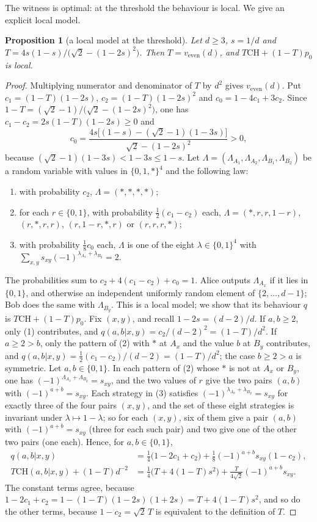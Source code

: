 \documentclass[11pt]{amsart}
\newtheorem{proposition}[theorem]{Proposition}
\theoremstyle{definition}
\theoremstyle{remark}
\numberwithin{equation}{section}
\newcommand{\veven}{v_{\mathrm{even}}}
\newcommand{\CH}{\mathrm{CH}}
\begin{document}
The witness is optimal: at the threshold the behaviour is local. We give an explicit local model.

\begin{proposition}[a local model at the threshold]\label{prop:flagmodel}
Let $d\ge3$, $s=1/d$ and $T=4s(1-s)/\bigl(\sqrt2-(1-2s)^2\bigr)$. Then $T=\veven(d)$, and $T\CH+(1-T)p_0$ is local.
\end{proposition}

\begin{proof}
Multiplying numerator and denominator of $T$ by $d^2$ gives $\veven(d)$. Put $c_1=(1-T)(1-2s)$, $c_2=(1-T)(1-2s)^2$ and
$c_0=1-4c_1+3c_2$. Since $1-T=(\sqrt2-1)/\bigl(\sqrt2-(1-2s)^2\bigr)$, one has $c_1-c_2=2s(1-T)(1-2s)\ge0$ and
\[
c_0=\frac{4s\bigl[(1-s)-(\sqrt2-1)(1-3s)\bigr]}{\sqrt2-(1-2s)^2}>0,
\]
because $(\sqrt2-1)(1-3s)<1-3s\le1-s$. Let $\Lambda=(\Lambda_{A_1},\Lambda_{A_2},\Lambda_{B_1},\Lambda_{B_2})$ be a random
variable with values in $\{0,1,\ast\}^4$ and the following law:
\begin{enumerate}
\item with probability $c_2$, $\Lambda=(\ast,\ast,\ast,\ast)$;
\item for each $r\in\{0,1\}$, with probability $\frac12(c_1-c_2)$ each, $\Lambda=(\ast,r,r,1-r)$, $(r,\ast,r,r)$,
$(r,1-r,\ast,r)$ or $(r,r,r,\ast)$;
\item with probability $\frac18c_0$ each, $\Lambda$ is one of the eight $\lambda\in\{0,1\}^4$ with
$\sum_{x,y}s_{xy}(-1)^{\lambda_{A_x}+\lambda_{B_y}}=2$.
\end{enumerate}
The probabilities sum to $c_2+4(c_1-c_2)+c_0=1$. Alice outputs $\Lambda_{A_x}$ if it lies in $\{0,1\}$, and otherwise an
independent uniformly random element of $\{2,\dots,d-1\}$; Bob does the same with $\Lambda_{B_y}$. This is a local
model; we show that its behaviour $q$ is $T\CH+(1-T)p_0$. Fix $(x,y)$, and recall $1-2s=(d-2)/d$. If $a,b\ge2$, only
(1) contributes, and $q(a,b|x,y)=c_2/(d-2)^2=(1-T)/d^2$. If $a\ge2>b$, only the pattern of (2) with $\ast$ at $A_x$ and
the value $b$ at $B_y$ contributes, and $q(a,b|x,y)=\frac12(c_1-c_2)/(d-2)=(1-T)/d^2$; the case $b\ge2>a$ is
symmetric. Let $a,b\in\{0,1\}$. In each pattern of (2) whose $\ast$ is not at $A_x$ or $B_y$, one has
$(-1)^{\Lambda_{A_x}+\Lambda_{B_y}}=s_{xy}$, and the two values of $r$ give the two pairs $(a,b)$ with
$(-1)^{a+b}=s_{xy}$. Each strategy in (3) satisfies $(-1)^{\lambda_{A_x}+\lambda_{B_y}}=s_{xy}$ for exactly three of
the four pairs $(x,y)$, and the set of these eight strategies is invariant under $\lambda\mapsto1-\lambda$; so for each
$(x,y)$, six of them give a pair $(a,b)$ with $(-1)^{a+b}=s_{xy}$ (three for each such pair) and two give one of the
other two pairs (one each). Hence, for $a,b\in\{0,1\}$,
\begin{align*}
q(a,b|x,y)&=\tfrac14\bigl(1-2c_1+c_2\bigr)+\tfrac18(-1)^{a+b}s_{xy}(1-c_2),\\
T\CH(a,b|x,y)+(1-T)d^{-2}&=\tfrac14\bigl(T+4(1-T)s^2\bigr)+\tfrac{T}{4\sqrt2}(-1)^{a+b}s_{xy}.
\end{align*}
The constant terms agree, because $1-2c_1+c_2=1-(1-T)(1-2s)(1+2s)=T+4(1-T)s^2$, and so do the other terms, because
$1-c_2=\sqrt2\,T$ is equivalent to the definition of $T$.
\end{proof}
\end{document}
